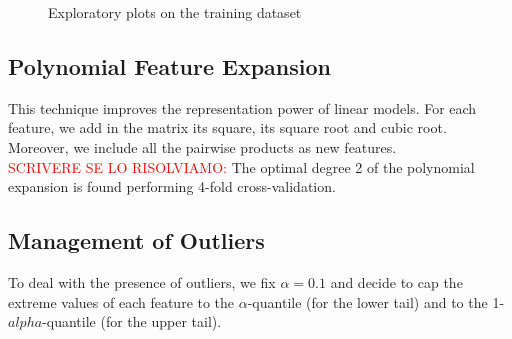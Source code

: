 \documentclass[10pt,conference,compsocconf]{IEEEtran}
\begin{document}
\begin{figure}[h]
    \centering
    \quad
    \caption{Exploratory plots on the training dataset}
    \label{fig:empdistr}
\end{figure}

\subsection{Polynomial Feature Expansion}
This technique improves the representation power of linear models. For each feature, we add in the matrix its square, its square root and cubic root.
Moreover, we include all the pairwise products as new features.\\
\textcolor{red}{SCRIVERE SE LO RISOLVIAMO:} The optimal degree 2 of the polynomial expansion is found performing 4-fold cross-validation.

\subsection{Management of Outliers}
To deal with the presence of outliers, we fix $\alpha = 0.1$ and decide to cap the extreme values of each feature to the $\alpha$-quantile (for the lower tail) and to the 1-$alpha$-quantile (for the upper tail).
\end{document}

